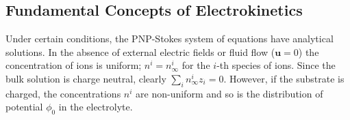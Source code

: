 %


\subsection{Fundamental Concepts of Electrokinetics}
Under certain conditions, the PNP-Stokes system of equations have analytical solutions. In the absence of external electric fields or fluid flow ($\mathbf{u}=0$) the concentration of ions is uniform; $n^i = n_\infty^i$ for the $i$-th species of ions. Since the bulk solution is charge neutral, clearly $\sum_{i} n_\infty^i z_i = 0$. However, if the substrate is charged, the concentrations $n^i$ are non-uniform and so is the distribution of potential $\phi_0$ in the electrolyte.  





